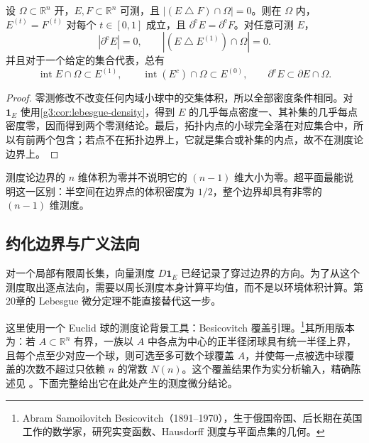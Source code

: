 \begin{proposition}\label{g3:prop:essential-boundary-invariance}
	设 \(\Omega\subset\mathbb R^n\) 开，\(E,F\subset\mathbb R^n\) 可测，且 \(|(E\mathbin{\triangle}F)\cap\Omega|=0\)。则在 \(\Omega\) 内，\(E^{(t)}=F^{(t)}\) 对每个 \(t\in[0,1]\) 成立，且 \(\partial^{\mathrm e}E=\partial^{\mathrm e}F\)。对任意可测 \(E\)，
	\[
		|\partial^{\mathrm e}E|=0,\qquad
		|(E\mathbin{\triangle}E^{(1)})\cap\Omega|=0.
	\]
	并且对于一个给定的集合代表，总有
	\[
		\operatorname{int}E\cap\Omega\subset E^{(1)},\qquad
		\operatorname{int}(E^c)\cap\Omega\subset E^{(0)},\qquad
		\partial^{\mathrm e}E\subset\partial E\cap\Omega.
	\]
\end{proposition}
\begin{proof}
	零测修改不改变任何内域小球中的交集体积，所以全部密度条件相同。对 \(\mathbf1_E\) 使用\cref{g3:cor:lebesgue-density}，得到 \(E\) 的几乎每点密度一、其补集的几乎每点密度零，因而得到两个零测结论。最后，拓扑内点的小球完全落在对应集合中，所以有前两个包含；若点不在拓扑边界上，它就是集合或补集的内点，故不在测度论边界上。
\end{proof}

测度论边界的 \(n\) 维体积为零并不说明它的 \((n-1)\) 维大小为零。超平面最能说明这一区别：半空间在边界点的体积密度为 \(1/2\)，整个边界却具有非零的 \((n-1)\) 维测度。

\subsection{约化边界与广义法向}
\label{g3:subsec:2103:02}
对一个局部有限周长集，向量测度 \(D\mathbf1_E\) 已经记录了穿过边界的方向。为了从这个测度取出逐点法向，需要以周长测度本身计算平均值，而不是以环境体积计算。第20章的 Lebesgue 微分定理不能直接替代这一步。

\ProseParagraphBreak
这里使用一个 Euclid 球的测度论背景工具：Besicovitch 覆盖引理。\footnote{Abram Samoilovitch Besicovitch（1891--1970），生于俄国帝国、后长期在英国工作的数学家，研究实变函数、Hausdorff 测度与平面点集的几何。}其所用版本为：若 \(A\subset\mathbb R^n\) 有界，一族以 \(A\) 中各点为中心的正半径闭球具有统一半径上界，且每个点至少对应一个球，则可选至多可数个球覆盖 \(A\)，并使每一点被选中球覆盖的次数不超过只依赖 \(n\) 的常数 \(N(n)\)。这个覆盖结果作为实分析输入，精确陈述见 \cite[第4节，引理4.6，第23--24页]{Simon1983}。下面完整给出它在此处产生的测度微分结论。

